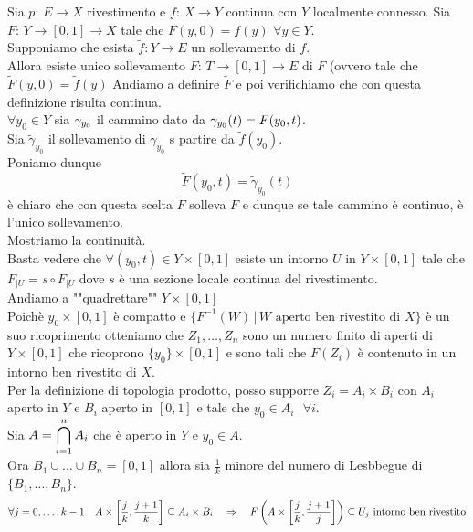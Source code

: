 \begin{thm}\bianco
Sia $p:\, E \to X$ rivestimento e $f:\, X \to Y$ continua con $Y$ localmente connesso.
Sia $F:\, Y \to [0,1] \to X $ tale che $F(y,0)=f(y) \, \, \forall y \in Y$.\\
Supponiamo che esista $\tilde{f}: Y \to E$  un sollevamento di $f$.\\
Allora esiste unico sollevamento $\tilde{F}:\, T \to [0,1] \to E$ di $F$ (ovvero tale che $\tilde{F}(y,0)=\tilde{f}(y)$
\proof Andiamo a definire $\tilde{F}$ e poi verifichiamo che con questa definizione risulta continua.\\
$\forall y_0\in Y$ sia $\gamma_{y_0}$ il cammino dato da $\gamma_{y_0}(t)=F(y_0,t)$.\\
Sia $\tilde{\gamma}_{y_0}$ il sollevamento di $\gamma_{y_0}$ s partire da $\tilde{f}(y_0)$.\\
Poniamo dunque $$\tilde{F}(y_0,t)= \tilde{\gamma}_{y_0}(t)$$
\`e chiaro che con questa scelta $\tilde{F}$ solleva $F$ e dunque se tale cammino \`e continuo, \`e l'unico sollevamento.\\
Mostriamo la continuit\`a.\\
Basta vedere che $\forall (y_0,t) \in Y \times[0,1]$ esiste un intorno $U$ in $Y \times [0,1]$ tale che $\tilde{F}_{\vert U} = s\circ F_{\vert U}$ dove $s$ \`e una sezione locale continua del rivestimento.\\
Andiamo a ""quadrettare"" $Y \times [0,1]$\\
Poich\`e $y_0\times [0,1]$ \`e compatto e $\{ F^{-1}(W) \, \vert \, W \text{ aperto ben rivestito di } X \}$ 
\`e un suo ricoprimento otteniamo che $Z_1, \dots, Z_n$ sono un numero finito  di aperti di $Y \times [0,1]$ che ricoprono $\{ y_0\} \times [0,1]$ e sono tali che $F(Z_i)$ \`e contenuto in un intorno ben rivestito di $X$.\\
Per la definizione di topologia prodotto, posso supporre $Z_i =A_i \times B_i$ con $A_i$ aperto in $Y$ e $B_i$ aperto in $[0,1]$ e tale che $y_0 \in A_i$ $\, \, \forall i$.\\
Sia $A=\displaystyle \bigcap_{i=1}^n A_i $ che \`e aperto in $Y$ e $y_0 \in A$.\\
Ora $B_1 \cup \dots \cup B_n =[0,1]$ allora sia $\frac{1}{k}$ minore del numero di Lesbbegue di $\{ B_1, \dots, B_n\}$.\\
$$\forall j=0,\dots, k-1 \quad A \times \left[ \frac{j}{k} , \frac{j+1}{k}\right] \subseteq A_i \times B_i \quad \Rightarrow\quad F \left( A \times \left[ \frac{j}{k},\frac{j+1}{j} \right] \right) \subseteq U_j \text{ intorno ben rivestito}$$

\end{thm}
